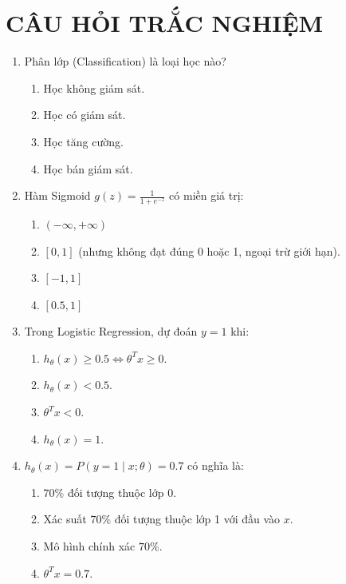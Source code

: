 \documentclass[10pt]{article}
\begin{document}
\newpage
\section{CÂU HỎI TRẮC NGHIỆM}

\begin{enumerate}[leftmargin=*, label=\textbf{Câu \arabic*.}]

    \item Phân lớp (Classification) là loại học nào?
    \begin{enumerate}[label=\Alph*.]
        \item Học không giám sát.
        \item Học có giám sát.
        \item Học tăng cường.
        \item Học bán giám sát.
    \end{enumerate}

    \item Hàm Sigmoid $g(z) = \frac{1}{1+e^{-z}}$ có miền giá trị:
    \begin{enumerate}[label=\Alph*.]
        \item $(-\infty, +\infty)$
        \item $[0, 1]$ (nhưng không đạt đúng 0 hoặc 1, ngoại trừ giới hạn).
        \item $[-1, 1]$
        \item $[0.5, 1]$
    \end{enumerate}

    \item Trong Logistic Regression, dự đoán $y = 1$ khi:
    \begin{enumerate}[label=\Alph*.]
        \item $h_\theta(x) \geq 0.5 \Leftrightarrow \theta^Tx \geq 0$.
        \item $h_\theta(x) < 0.5$.
        \item $\theta^Tx < 0$.
        \item $h_\theta(x) = 1$.
    \end{enumerate}

    \item $h_\theta(x) = P(y=1 \mid x; \theta) = 0.7$ có nghĩa là:
    \begin{enumerate}[label=\Alph*.]
        \item $70\%$ đối tượng thuộc lớp 0.
        \item Xác suất $70\%$ đối tượng thuộc lớp 1 với đầu vào $x$.
        \item Mô hình chính xác $70\%$.
        \item $\theta^Tx = 0.7$.
    \end{enumerate}


\end{enumerate}
\end{document}
